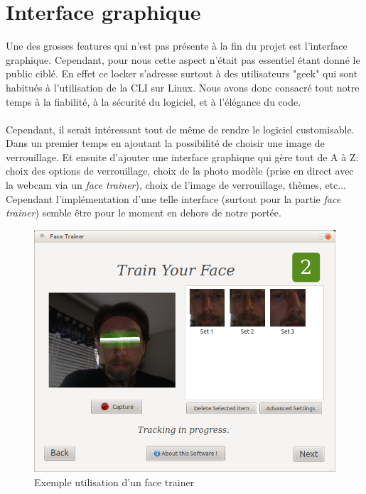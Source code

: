 \documentclass[french]{report}
\begin{document}
\section{Interface graphique}
Une des grosses features qui n'est pas présente à la fin du projet est l'interface
graphique. Cependant, pour nous cette aspect n'était pas essentiel étant donné le public ciblé.
En effet ce locker s'adresse surtout à des utilisateurs "geek" qui sont habitués à
l'utilisation de la CLI sur Linux. Nous avons donc consacré tout notre temps à
la fiabilité, à la sécurité du logiciel, et à l'élégance du code.\\\\
Cependant, il serait intéressant tout de même de rendre le logiciel customisable.
Dans un premier temps en ajoutant la possibilité de choisir une image de verrouillage.
Et ensuite d'ajouter une interface graphique qui gère tout de A à Z: choix des options
de verrouillage, choix de la photo modèle (prise en direct avec la webcam via un \emph{face trainer}), choix de
l'image de verrouillage, thèmes, etc...\\
Cependant l'implémentation d'une telle interface (surtout pour la partie \emph{face trainer})
semble être pour le moment en dehors de notre portée.

\begin{figure}[h]\label{fig:facetrain}
  \includegraphics[width=\linewidth]{facetrain}
  \caption{Exemple utilisation d'un face trainer}
  \label{fig:facetrain}
\end{figure}
\end{document}

